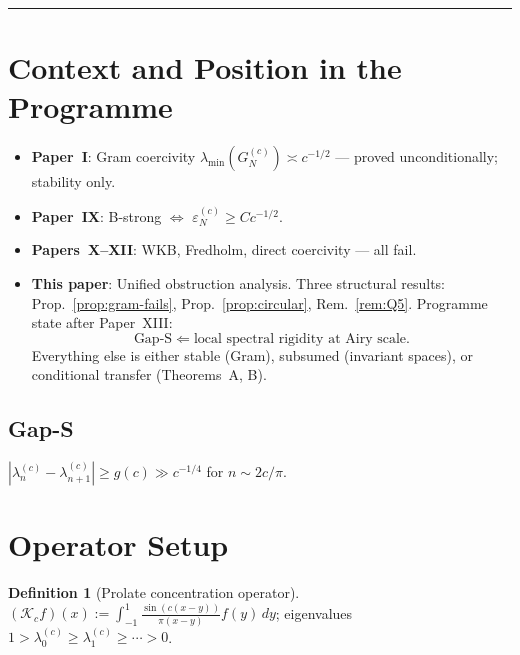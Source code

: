 \documentclass[12pt,a4paper]{amsart}
\theoremstyle{definition}
\newtheorem{definition}[theorem]{Definition}
\theoremstyle{remark}
\newcommand{\Kc}{\mathcal{K}_c}
\newcommand{\lam}[2]{\lambda_{#2}^{(#1)}}
\begin{document}
\maketitle
\tableofcontents
\bigskip\hrule\bigskip

\section{Context and Position in the Programme}
\label{sec:context}

\begin{itemize}[nosep]
  \item \textbf{Paper~I}: Gram coercivity $\lambda_{\min}(G_N^{(c)}) \asymp c^{-1/2}$ ---
    proved unconditionally; stability only.
  \item \textbf{Paper~IX}: B-strong $\Leftrightarrow$ $\varepsilon_N^{(c)} \geq Cc^{-1/2}$.
  \item \textbf{Papers~X--XII}: WKB, Fredholm, direct coercivity --- all fail.
  \item \textbf{This paper}: Unified obstruction analysis.
    Three structural results:
    Prop.~\ref{prop:gram-fails}, Prop.~\ref{prop:circular},
    Rem.~\ref{rem:Q5}.
    Programme state after Paper~XIII:
    \[
      \text{Gap-S} \;\Longleftarrow\;
      \text{local spectral rigidity at Airy scale.}
    \]
    Everything else is either stable (Gram), subsumed (invariant spaces),
    or conditional transfer (Theorems~A, B).
\end{itemize}

\subsection{Gap-S}

$|\lam{c}{n} - \lam{c}{n+1}| \geq g(c) \gg c^{-1/4}$ for $n \sim 2c/\pi$.

\section{Operator Setup}
\label{sec:setup}

\begin{definition}[Prolate concentration operator]
$(\Kc f)(x) := \int_{-1}^1 \tfrac{\sin(c(x-y))}{\pi(x-y)} f(y)\,dy$;
eigenvalues $1 > \lam{c}{0} \geq \lam{c}{1} \geq \cdots > 0$.
\end{definition}
\end{document}
